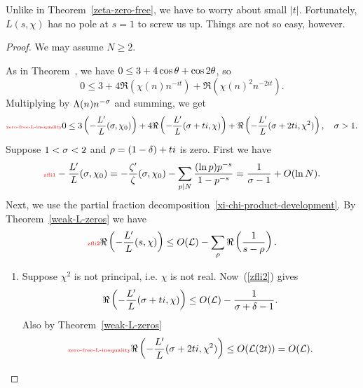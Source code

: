Unlike in Theorem~\ref{zeta-zero-free}, we have to worry about small $|t|$. Fortunately, $L(s,\chi)$ has no pole at $s=1$ to screw us up. Things are not so easy, however.
\begin{proof}
We may assume $N\ge 2$.

As in Theorem~, we have $0\le 3+4\cos \theta+\cos 2\theta$, so
\[
0\le 3+4\Re(\chi(n)n^{-it})+\Re(\chi(n)^2n^{-2it}).
\]
Multiplying by $\Lambda(n)n^{-\sigma}$ and summing, we get
\begin{equation}\llabel{zero-free-L-inequality}
0\le 3\pa{-\frac{L'}{L}(\si,\chi_0)} 
+4\Re\pa{-\frac{L'}{L}(\si+ti,\chi)}
+\Re\pa{-\frac{L'}{L}(\si+2ti,\chi^2)},\quad\si>1.
\end{equation}
Suppose $1<\sigma<2$ and $\rho=(1-\delta)+ti$ is zero.
First we have
\begin{equation}\llabel{zfli1}
-\fc{L'}{L}(\si,\chi_0) =-\fc{\ze'}{\ze}(\si,\chi_0) - \sum_{p\mid N}\fc{(\ln p)p^{-s}}{1-p^{-s}}=\rc{\si-1} +O(\ln N).
\end{equation}
Next, we use the partial fraction decomposition~\ref{xi-chi-product-development}.
By  %
Theorem~\ref{weak-L-zeros} we have
\begin{equation}\llabel{zfli2}
\Re\pa{-\frac{L'}{L}(s,\chi)} %
\le O(\cal L)-\sum_{\rh}\Re\prc{s-\rh}.
\end{equation}
\begin{enumerate}
\item
Suppose $\chi^2$ is not principal, i.e. $\chi$ is not real. %
Now~(\ref{zfli2}) gives
\begin{equation}
\Re\left( {-\frac{L'}{L}(\sigma+ti,\chi)} \right)\le O(\mathcal{L})-\frac{1}{\sigma+\delta-1}.
\end{equation}
Also by Theorem~\ref{weak-L-zeros}
\begin{equation}\llabel{zero-free-L-inequality}
\Re\pa{-\frac{L'}{L}(\si+2ti,\chi^2)}\le O(\cal L(2t))=O(\cal L).
\end{equation}

\end{enumerate}
\end{proof}

